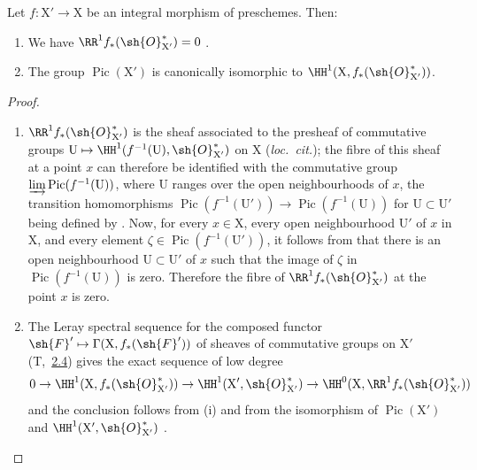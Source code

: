 \begin{corollary}[21.8.2]
\label{IV.21.8.2}
Let $f:\mathrm{X}'\to\mathrm{X}$ be an integral morphism of preschemes.
Then:
\begin{enumerate}[label=(\roman*)]
  \item We have $\RR^1 f_*(\sh{O}^*_{\mathrm{X}'})=0$ .
  \item The group $\operatorname{Pic}(\mathrm{X}')$ is canonically isomorphic to $\HH^1(\mathrm{X},f_*(\sh{O}^*_{\mathrm{X}'}))$.
\end{enumerate}
\end{corollary}

\begin{proof}
\begin{enumerate}[label=(\roman*)]
  \item $\RR^1f_*(\sh{O}^*_{\mathrm{X}'})$ is the sheaf associated to the presheaf of commutative groups $\mathrm{U}\mapsto\HH^1(f^{-1}(\mathrm{U}),\sh{O}^*_{\mathrm{X}'})$ on $\mathrm{X}$ (\emph{loc.\ cit.});
  the fibre of this sheaf at a point $x$ can therefore be identified  with the commutative group $\varinjlim\operatorname{Pic}(f^{-1}(\mathrm{U}))$, where $\mathrm{U}$ ranges over the open neighbourhoods of $x$, the transition homomorphisms $\operatorname{Pic}(f^{-1}(\mathrm{U}'))\to\operatorname{Pic}(f^{-1}(\mathrm{U}))$ for $\mathrm{U}\subset\mathrm{U}'$ being defined by .
Now, for every $x\in\mathrm{X}$, every open neighbourhood $\mathrm{U}'$ of $x$ in $\mathrm{X}$, and every element $\zeta\in\operatorname{Pic}(f^{-1}(\mathrm{U}'))$, it follows from  that there is an open neighbourhood $\mathrm{U}\subset\mathrm{U}'$ of $x$ such that the image of $\zeta$ in $\operatorname{Pic}(f^{-1}(\mathrm{U}))$ is zero.
Therefore the fibre of $\RR^1 f_*(\sh{O}^*_{\mathrm{X}'})$ at the point $x$ is zero.

  \item The Leray spectral sequence for the composed functor $\sh{F}'\mapsto\Gamma(\mathrm{X},f_*(\sh{F}'))$ of sheaves of commutative groups on $\mathrm{X}'$ (T,~{\hyperlink{ega4.c04.subsec.2-4}{2.4}}) gives the exact sequence of low degree
\[
  0\to\HH^1(\mathrm{X},f_*(\sh{O}^*_{\mathrm{X}'}))\to\HH^1(\mathrm{X}',\sh{O}^*_{\mathrm{X}'})\to\HH^0(\mathrm{X},\RR^1 f_*(\sh{O}^*_{\mathrm{X}'}))
\]
and the conclusion follows from (i) and from the isomorphism of $\operatorname{Pic}(\mathrm{X}')$ and $\HH^1(\mathrm{X}',\sh{O}^*_{\mathrm{X}'})$ .
\end{enumerate}
\end{proof}

